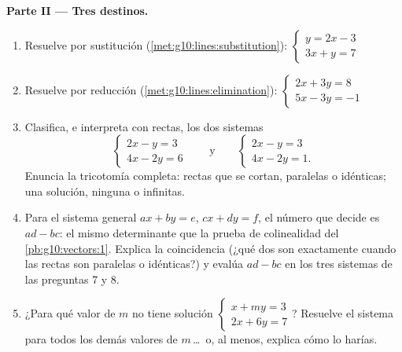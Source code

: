 \begin{problem}
\medskip
\noindent\textbf{Parte II --- Tres destinos.}
\begin{enumerate}[resume]
  \item Resuelve por sustitución (\cref{met:g10:lines:substitution}):
        $\begin{cases} y = 2x - 3 \\ 3x + y = 7 \end{cases}$
  \item Resuelve por reducción (\cref{met:g10:lines:elimination}):
        $\begin{cases} 2x + 3y = 8 \\ 5x - 3y = -1 \end{cases}$
  \item Clasifica, e interpreta con rectas, los dos sistemas
        \[
        \begin{cases} 2x - y = 3 \\ 4x - 2y = 6 \end{cases}
        \qquad\text{y}\qquad
        \begin{cases} 2x - y = 3 \\ 4x - 2y = 1 . \end{cases}
        \]
        Enuncia la tricotomía completa: rectas que se cortan, paralelas o
        idénticas; una solución, ninguna o infinitas.
  \item Para el sistema general $ax + by = e$, $cx + dy = f$, el número
        que decide es $ad - bc$: el mismo determinante que la prueba de
        colinealidad del \cref{pb:g10:vectors:1}. Explica la coincidencia
        (¿qué dos  son  exactamente cuando las rectas
        son paralelas o idénticas?) y evalúa $ad - bc$ en los tres
        sistemas de las preguntas 7 y 8.
  \item ¿Para qué valor de $m$ no tiene solución
        $\begin{cases} x + my = 3 \\ 2x + 6y = 7 \end{cases}$? Resuelve el
        sistema para todos los demás valores de $m$\,\dots\ o, al menos,
        explica cómo lo harías.
\end{enumerate}


\end{problem}
